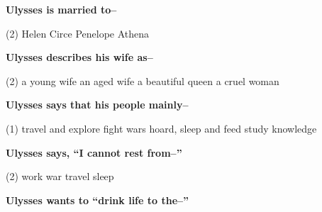 \documentclass[12pt,a4paper]{exam}
\begin{document}
\begin{questions}
	\begin{minipage}{\textwidth}
		\question \textbf{Ulysses is married to--}

		\begin{tasks}(2)
			\task Helen
			\task Circe
			\task Penelope
			\task Athena
		\end{tasks}
	\end{minipage}


	\begin{minipage}{\textwidth}
		\question \textbf{Ulysses describes his wife as--}

		\begin{tasks}(2)
			\task a young wife
			\task an aged wife
			\task a beautiful queen
			\task a cruel woman
		\end{tasks}
	\end{minipage}


	\begin{minipage}{\textwidth}
		\question \textbf{Ulysses says that his people mainly--}

		\begin{tasks}(1)
			\task travel and explore
			\task fight wars
			\task hoard, sleep and feed
			\task study knowledge
		\end{tasks}
	\end{minipage}


	\begin{minipage}{\textwidth}
		\question \textbf{Ulysses says, ``I cannot rest from--''}

		\begin{tasks}(2)
			\task work
			\task war
			\task travel
			\task sleep
		\end{tasks}
	\end{minipage}


	\begin{minipage}{\textwidth}
		\question \textbf{Ulysses wants to ``drink life to the--''}


\end{minipage}
\end{questions}
\end{document}
